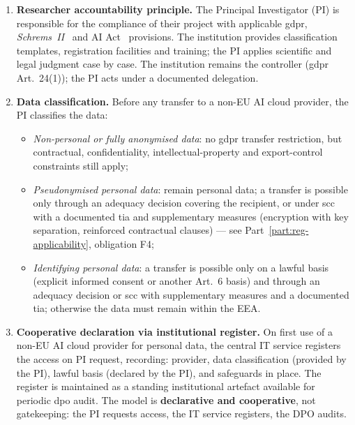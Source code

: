 \begin{enumerate}[nosep]
    \item \textbf{Researcher accountability principle.} The Principal
    Investigator (PI) is responsible for the compliance of their
    project with applicable \gls{gdpr},
    \emph{Schrems~II}~\cite{schrems2020} and AI
    Act~\cite{eu-ai-act} provisions. The institution provides
    classification templates, registration facilities and training;
    the PI applies scientific and legal judgment case by case. The
    institution remains the controller (\gls{gdpr} Art.~24(1)); the
    PI acts under a documented delegation.

    \item \textbf{Data classification.} Before any transfer to a
    non-EU AI cloud provider, the PI classifies the data:
    \begin{itemize}[nosep]
        \item \emph{Non-personal or fully anonymised data}: no
        \gls{gdpr} transfer restriction, but contractual,
        confidentiality, intellectual-property and export-control
        constraints still apply;
        \item \emph{Pseudonymised personal data}: remain personal
        data; a transfer is possible only through an adequacy
        decision covering the recipient, or under \gls{scc} with a
        documented \gls{tia} and supplementary measures (encryption
        with key separation, reinforced contractual clauses) --- see
        Part~\ref{part:reg-applicability}, obligation F4;
        \item \emph{Identifying personal data}: a transfer is
        possible only on a lawful basis (explicit informed consent
        or another Art.~6 basis) and through an adequacy decision or
        \gls{scc} with supplementary measures and a documented
        \gls{tia}; otherwise the data must remain within the EEA.
    \end{itemize}

    \item \textbf{Cooperative declaration via institutional register.}
    On first use of a non-EU AI cloud provider for personal data, the
    central IT service registers the access on PI request, recording:
    provider, data classification (provided by the PI), lawful basis
    (declared by the PI), and safeguards in place. The register is
    maintained as a standing institutional artefact available for
    periodic \gls{dpo} audit. The model is \textbf{declarative and
    cooperative}, not gatekeeping: the PI requests access, the IT
    service registers, the DPO audits.


\end{enumerate}
